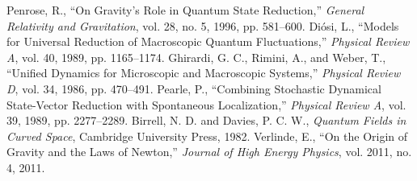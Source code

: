 \documentclass[11pt,a4paper]{article}
\begin{document}
\begin{thebibliography}{99}
 Penrose, R., ``On Gravity's Role in Quantum State Reduction,'' \textit{General Relativity and Gravitation}, vol. 28, no. 5, 1996, pp. 581--600.
 Di\'osi, L., ``Models for Universal Reduction of Macroscopic Quantum Fluctuations,'' \textit{Physical Review A}, vol. 40, 1989, pp. 1165--1174.
 Ghirardi, G. C., Rimini, A., and Weber, T., ``Unified Dynamics for Microscopic and Macroscopic Systems,'' \textit{Physical Review D}, vol. 34, 1986, pp. 470--491.
 Pearle, P., ``Combining Stochastic Dynamical State-Vector Reduction with Spontaneous Localization,'' \textit{Physical Review A}, vol. 39, 1989, pp. 2277--2289.
 Birrell, N. D. and Davies, P. C. W., \textit{Quantum Fields in Curved Space}, Cambridge University Press, 1982.
 Verlinde, E., ``On the Origin of Gravity and the Laws of Newton,'' \textit{Journal of High Energy Physics}, vol. 2011, no. 4, 2011.
\end{thebibliography}
\end{document}
